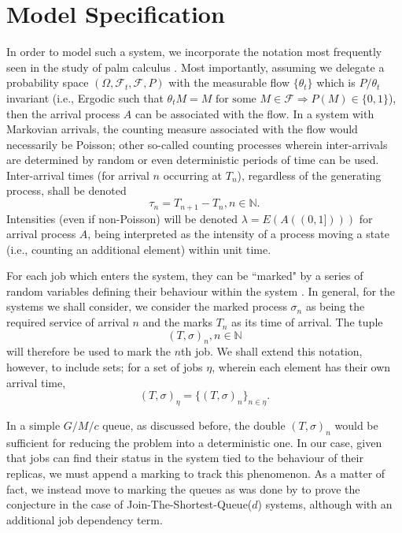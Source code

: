 
\chapter{Model Specification}\label{ch:model-specification}

In order to model such a system, we incorporate the notation most frequently seen in the
study of palm calculus \cite{baccelli_elements_2003}. Most importantly, assuming we delegate a probability space $(\Omega, \mathcal{F}_{t}, \mathcal{F}, P)$ with the measurable flow $\{\theta_{t}\}$ which is $P/\theta_{t}$ invariant (i.e., Ergodic such that $\theta_{t}M = M \text{  for some } M \in \mathcal{F} \Rightarrow P(M) \in \{0,1\}$), then the arrival process $A$ can be associated with the flow.
In a system with Markovian arrivals, the counting measure associated with the flow would necessarily be Poisson;
other so-called counting processes wherein inter-arrivals are determined by random or even deterministic periods of time can be used. Inter-arrival times (for arrival $n$ occurring at $T_{n}$), regardless of the generating process, shall be denoted
\[\tau_{n} = T_{n+1}  - T_{n}, n \in \mathbb{N}.\]
Intensities (even if non-Poisson) will be denoted $\lambda = E(A((0,1])))$ for arrival process $A$, being interpreted as the intensity of a process moving a state (i.e., counting an additional element) within unit time.
\begin{definition}
    For each job which enters the system, they can be ``marked" by a series of random variables defining their behaviour within the system \cite{baccelli_elements_2003}. In general, for the systems we shall consider, we consider the marked process $\sigma_{n}$ as being the required service of arrival $n$ and the marks $T_{n}$ as its time of arrival.
    The tuple \[(T,\sigma)_{n}, n \in \mathbb{N}\] will therefore be used to mark the $n$th job.
    We shall extend this notation, however, to include sets;
    for a set of jobs $\eta$, wherein each element has their own arrival time,
    \[(T, \sigma)_{\eta} = \{(T,\sigma)_{n}\}_{n \in \eta}.\]
\end{definition}

In a simple $G/M/c$ queue, as discussed before, the double $(T,\sigma)_{n}$ would be sufficient for reducing the problem into a deterministic one.
In our case, given that jobs can find their status in the system tied to the behaviour of their replicas, we must append a marking to track this phenomenon.
As a matter of fact, we instead move to marking the queues as was done by \cite{bramson_asymptotic_2012} to prove the conjecture in the case of Join-The-Shortest-Queue($d$) systems, although with an additional job dependency term.

